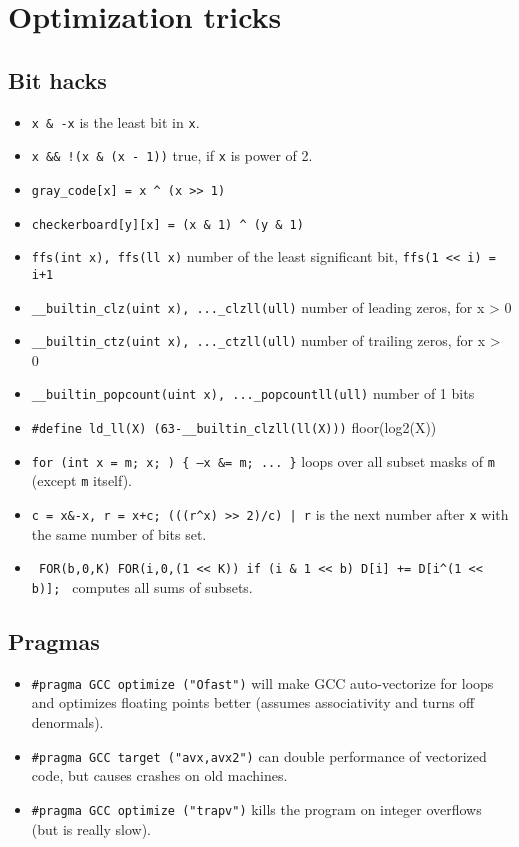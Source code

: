\section{Optimization tricks}
\subsection{Bit hacks}
\begin{itemize}
\item \texttt{x \& -x} is the least bit in \texttt{x}.
\item \texttt{x \&\& !(x \& (x - 1))} true, if \texttt{x} is power of 2.
\item \texttt{gray\_code[x] = x \^{} (x >> 1)}
\item \texttt{checkerboard[y][x] = (x \& 1) \^{} (y \& 1)}
\item \texttt{ffs(int x), ffs(ll x)} number of the least significant bit, \texttt{ffs(1 << i) = i+1}
\item \texttt{\_\_builtin\_clz(uint x), ...\_clzll(ull)} number of leading zeros, for x > 0
\item \texttt{\_\_builtin\_ctz(uint x), ...\_ctzll(ull)} number of trailing zeros, for x > 0
\item \texttt{\_\_builtin\_popcount(uint x), ...\_popcountll(ull)} number of 1 bits
\item \texttt{\#define ld\_ll(X) (63-\_\_builtin\_clzll(ll(X)))} floor(log2(X))
\item \texttt{for (int x = m; x; ) \{ --x \&= m; ... \}} loops over all subset masks of \texttt{m} (except \texttt{m} itself).
\item \texttt{c = x\&-x, r = x+c; (((r\^{}x) >> 2)/c) | r} is the next number after \texttt{x} with the same number of bits set.
\item \texttt{ FOR(b,0,K) FOR(i,0,(1 << K)) if (i \& 1 << b) D[i] += D[i\^{}(1 << b)]; } computes all sums of subsets.
\end{itemize}
\subsection{Pragmas}
\begin{itemize}
\item \lstinline{#pragma GCC optimize ("Ofast")} will make GCC auto-vectorize for loops and optimizes floating points better (assumes associativity and turns off denormals).
\item \lstinline{#pragma GCC target ("avx,avx2")} can double performance of vectorized code, but causes crashes on old machines.
\item \lstinline{#pragma GCC optimize ("trapv")} kills the program on integer overflows (but is really slow).
\end{itemize}

